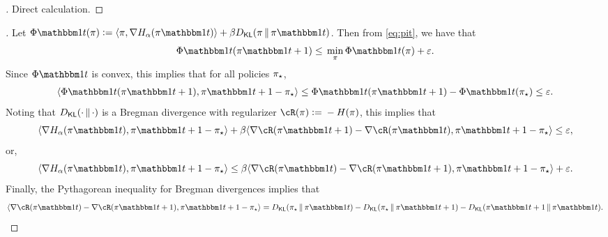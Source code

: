 \documentclass{article}
\begin{document}
  \begin{proof}[]
    Direct calculation.
  \end{proof}
  
      \begin{proof}[]
      Let
      $\Phi\ind{t}(\pi)\ldef{}\tri*{\pi,\grad{}H_\alpha(\pi\ind{t})} +
      \beta\Dkl{\pi}{\pi\ind{t}}$. Then from \cref{eq:pit}, we have
      that
      \[
        \Phi\ind{t}(\pi\ind{t+1})\leq{}\min_{\pi}\Phi\ind{t}(\pi) + \veps.
      \]
      Since $\Phi\ind{t}$ is convex, this implies that for all
      policies $\pi_{\star}$,
      \begin{align}
        \tri*{\Phi\ind{t}(\pi\ind{t+1}),\pi\ind{t+1}-\pistar}
        \leq{} \Phi\ind{t}(\pi\ind{t+1})-\Phi\ind{t}(\pistar) \leq \veps.
      \end{align}
      Noting that $\Dkl{\cdot}{\cdot}$ is a Bregman divergence with
      regularizer $\cR(\pi)\ldef{}-H(\pi)$, this implies that
      \[
        \tri*{\grad{}H_\alpha(\pi\ind{t}),\pi\ind{t+1}-\pistar}
        +
        \beta\tri*{\grad\cR(\pi\ind{t+1})-\grad\cR(\pi\ind{t}),\pi\ind{t+1}-\pistar}
        \leq \veps,
      \]
      or,
            \[
        \tri*{\grad{}H_\alpha(\pi\ind{t}),\pi\ind{t+1}-\pistar}
        \leq
        \beta\tri*{\grad\cR(\pi\ind{t})-\grad\cR(\pi\ind{t+1}),\pi\ind{t+1}-\pistar}
+ \veps.
\]
Finally, the Pythagorean inequality for Bregman divergences implies
that
\begin{align*}
  \tri*{\grad\cR(\pi\ind{t})-\grad\cR(\pi\ind{t+1}),\pi\ind{t+1}-\pistar}
  = \Dkl{\pistar}{\pi\ind{t}}
  - \Dkl{\pistar}{\pi\ind{t+1}}
  - \Dkl{\pi\ind{t+1}}{\pi\ind{t}}.
\end{align*}
      
    \end{proof}


\begin{comment}
  \subsubsection{Gradient Dominance}
  \newcommand{\ystar}{y^{\star}} Define the entropy for a policy $\pi$
  via
  \[
    H(\pi) = \sum_{y}\pi(y)\log\prn*{\frac{1}{\pi(y)}}.
  \]
  Not that this function is concave with respect to $\pi$.
  \begin{lemma}
    \label{lem:gd_bandit}
  
  \end{lemma}
  \begin{proof}[\pfref{lem:gd_bandit}]
  
  \end{proof}
\end{comment}
\end{document}
